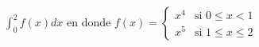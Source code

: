 \item $\displaystyle \int_0^2 f(x) dx$ en donde $f(x) = \begin{cases} x^4 & \text{si } 0 \le x < 1 \\ x^5 & \text{si } 1 \le x \le 2 \end{cases}$

